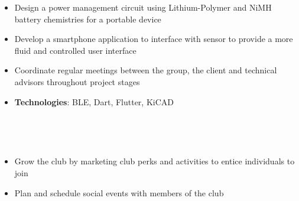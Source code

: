 \documentclass[10pt, letterpaper, ragged2e, withhyper]{altacv}
\begin{document}
\begin{paracol}{2}
    
    \begin{itemize}
        \item Design a power management circuit using Lithium-Polymer and NiMH battery chemistries for a portable device 
        \item Develop a smartphone application to interface with sensor to provide a more fluid and 
        controlled user interface
        \item Coordinate regular meetings between the group, the client and technical advisors throughout project stages   
        \item \textbf{Technologies}: BLE, Dart, Flutter, KiCAD
    \end{itemize}






\switchcolumn

     \\
    
    \divider
    
    \\







    \begin{itemize}
        \item Grow the club by marketing club perks and activities to entice individuals to join
        \item Plan and schedule social events with members of the club
    \end{itemize}


\end{paracol}
\end{document}
